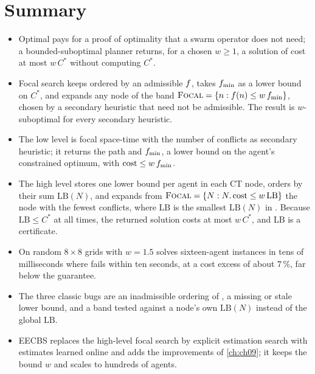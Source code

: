 \section{Summary}
\begin{summary}
\begin{itemize}
  \item Optimal \cbs pays for a proof of optimality that a swarm operator
        does not need; a bounded-suboptimal planner returns, for a chosen
        $w \ge 1$, a solution of cost at most $w\,C^*$ without computing $C^*$.
  \item Focal search keeps \Open ordered by an admissible $f$, takes
        $f_{\min}$ as a lower bound on $C^*$, and expands any node of the
        band $\textsc{Focal} = \left\{ n : f(n) \le w\,f_{\min} \right\}$, chosen by a
        secondary heuristic that need not be admissible. The result is
        $w$-suboptimal for every secondary heuristic.
  \item The \ecbs low level is focal space-time \astar with the number of
        conflicts as secondary heuristic; it returns the path and
        $f_{\min}$, a lower bound on the agent's constrained optimum, with
        $\operatorname{cost} \le w\,f_{\min}$.
  \item The \ecbs high level stores one lower bound per agent in each CT
        node, orders \Open by their sum $\mathrm{LB}(N)$, and expands from
        $\textsc{Focal} = \left\{ N : N.\operatorname{cost} \le w\,\mathrm{LB} \right\}$ the node with the
        fewest conflicts, where $\mathrm{LB}$ is the smallest $\mathrm{LB}(N)$
        in \Open. Because $\mathrm{LB} \le C^*$ at all times, the returned
        solution costs at most $w\,C^*$, and $\mathrm{LB}$ is a certificate.
  \item On random $8 \times 8$ grids \ecbs with $w = 1.5$ solves sixteen-agent
        instances in tens of milliseconds where \cbs fails within ten seconds,
        at a cost excess of about $7\,\%$, far below the guarantee.
  \item The three classic bugs are an inadmissible ordering of \Open, a
        missing or stale lower bound, and a band tested against a node's own
        $\mathrm{LB}(N)$ instead of the global $\mathrm{LB}$.
  \item EECBS replaces the high-level focal search by explicit estimation
        search with estimates learned online and adds the \cbs improvements of
        \cref{ch:ch09}; it keeps the bound $w$ and scales to hundreds of agents.
\end{itemize}
\end{summary}


